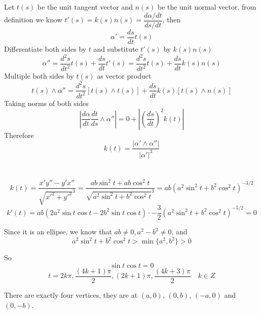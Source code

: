 \documentclass{article}
\begin{document}
\section{}
Let $t(s)$ be the unit tangent vector and $n(s)$ be the unit normal vector, from definition we know $t'(s)=k(s)n(s)=\dfrac{d\alpha/dt}{ds/dt}$, then
$$\alpha'=\frac{ds}{dt}t(s)$$
Differentiate both sides by $t$ and substitute $t'(s)$ by $k(s)n(s)$
$$\alpha''=\frac{d^2s}{dt^2}t(s)+\frac{ds}{dt}t'(s)=\frac{d^2s}{dt^2}t(s)+\frac{ds}{dt}k(s)n(s)$$
Multiple both sides by $t(s)$ as vector product
$$t(s)\land\alpha''=\frac{d^2s}{dt^2}[t(s)\land t(s)]+\frac{ds}{dt}k(s)[t(s)\land n(s)]$$
Taking norms of both sides
$$\left|\frac{d\alpha}{dt}\frac{dt}{ds}\land\alpha''\right|=0+\left|\left(\frac{ds}{dt}\right)^2k(t)\right|$$
Therefore
$$k(t)=\frac{|\alpha'\land\alpha''|}{|\alpha'|^3}$$



\section{}
$$k(t)=\frac{x'y''-y'x''}{\sqrt{x'^2+y'^2}^3}=\frac{ab\sin^2t+ab\cos^2t}{\sqrt{a^2\sin^2t+b^2\cos^2t}^3}=ab(a^2\sin^2t+b^2\cos^2t)^{-3/2}$$
$$k'(t)=ab(2a^2\sin t\cos t-2b^2\sin t\cos t)\cdot-\frac{3}{2}(a^2\sin^2t+b^2\cos^2t)^{-5/2}=0$$

Since it is an ellipse, we know that $ab\neq0,a^2-b^2\neq0$, and
$$a^2\sin^2t+b^2\cos^2t>\min\{a^2,b^2\}>0$$

So $$\sin t\cos t=0$$
$$t=2k\pi,\frac{(4k+1)\pi}{2},(2k+1)\pi,\frac{(4k+3)\pi}{2}\quad k\in Z$$

There are exactly four vertices, they are at $(a,0)$, $(0,b)$, $(-a,0)$ and $(0,-b)$.

\section{}
\end{document}
